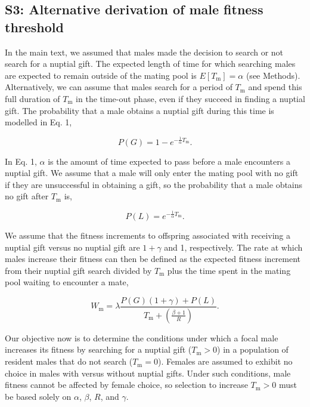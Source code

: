 \documentclass[
]{article}
\begin{document}
\clearpage

\hypertarget{s3-alternative-derivation-of-male-fitness-threshold}{%
\subsection{S3: Alternative derivation of male fitness
threshold}\label{s3-alternative-derivation-of-male-fitness-threshold}}

In the main text, we assumed that males made the decision to search or
not search for a nuptial gift. The expected length of time for which
searching males are expected to remain outside of the mating pool is
\(E[T_{\mathrm{m}}] = \alpha\) (see Methods). Alternatively, we can
assume that males search for a period of \(T_{\mathrm{m}}\) and spend
this full duration of \(T_{\mathrm{m}}\) in the time-out phase, even if
they succeed in finding a nuptial gift. The probability that a male
obtains a nuptial gift during this time is modelled in Eq. 1,

\[P(G) = 1 - e^{-\frac{1}{\alpha}T_{\mathrm{m}}}.\]

In Eq. 1, \(\alpha\) is the amount of time expected to pass before a
male encounters a nuptial gift. We assume that a male will only enter
the mating pool with no gift if they are unsuccessful in obtaining a
gift, so the probability that a male obtains no gift after
\(T_{\mathrm{m}}\) is,

\[P(L) = e^{-\frac{1}{\alpha}T_{\mathrm{m}}}.\]

We assume that the fitness increments to offspring associated with
receiving a nuptial gift versus no nuptial gift are \(1 + \gamma\) and
1, respectively. The rate at which males increase their fitness can then
be defined as the expected fitness increment from their nuptial gift
search divided by \(T_{\mathrm{m}}\) plus the time spent in the mating
pool waiting to encounter a mate,

\[W_{\mathrm{m}} = \lambda \frac{P(G)\left(1 + \gamma\right) + P(L)}{T_{\mathrm{m}} + \left( \frac{\beta + 1}{R} \right)}.\]

Our objective now is to determine the conditions under which a focal
male increases its fitness by searching for a nuptial gift
(\(T_{\mathrm{m}}>0\)) in a population of resident males that do not
search (\(T_{\mathrm{m}}=0\)). Females are assumed to exhibit no choice
in males with versus without nuptial gifts. Under such conditions, male
fitness cannot be affected by female choice, so selection to increase
\(T_{\mathrm{m}}>0\) must be based solely on \(\alpha\), \(\beta\),
\(R\), and \(\gamma\).
\end{document}
